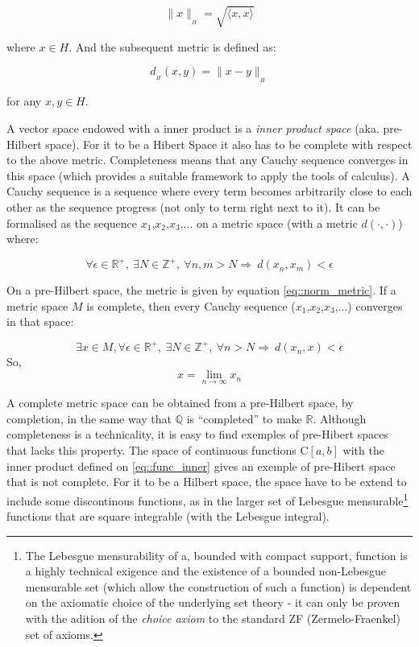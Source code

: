 \begin{equation}
  \| x \|_{_H} = \sqrt{ \langle x,x \rangle }
\end{equation}

where $x \in H$. And the subsequent metric is defined as:

\begin{equation}\label{eq::norm_metric}
  d_{_H}(x,y) = \| x - y \|_{_H}
\end{equation}

for any $x,y \in H$.

A vector space endowed with a inner product is a \textit{inner product space}
(aka. pre-Hilbert space). For it to be a Hibert Space it also has to be complete
with respect to the above metric. Completeness means that any Cauchy sequence
converges in this space (which provides a suitable framework to apply the tools
of calculus). A Cauchy sequence is a sequence where every term becomes
arbitrarily close to each other as the sequence progress (not only to term
right next to it). It can be formalised as the sequence
$x_1$,$x_2$,$x_3$,$\ldots$ on a metric space (with a metric $d( \cdot ,\cdot)$)
where:


\[ \forall \epsilon \in \mathbb{R}^+, ~\exists N \in \mathbb{Z}^+, ~\forall
n,m>N \Longrightarrow ~d(x_n,x_m)<\epsilon
\]

On a pre-Hilbert space, the metric is given by equation \ref{eq::norm_metric}.
If a metric space $M$ is complete, then every Cauchy sequence
($x_1$,$x_2$,$x_3$,$\ldots$) converges in that space:

\[ \exists x \in M, \forall \epsilon \in \mathbb{R}^+, ~\exists N \in \mathbb{Z}^+, ~\forall
n>N \Longrightarrow ~d(x_n,x)<\epsilon
\]
So,
\[ x = \lim_{n\to\infty} x_n \]

A complete metric space can be obtained from a pre-Hilbert space, by completion,
in the same way that $\mathbb{Q}$ is ``completed'' to make $\mathbb{R}$.
Although completeness is a technicality, it is easy to find exemples of
pre-Hibert spaces that lacks this property. The space of continuous functions
C$[a,b]$ with the inner product defined on \ref{eq::func_inner} gives an exemple
of pre-Hibert space that is not complete. For it to be a Hilbert space, the
space have to be extend to include some discontinous functions, as in the larger
set of Lebesgue mensurable\footnote{The Lebesgue mensurability of a, bounded
with compact support, function is a highly technical exigence and the existence
of a bounded non-Lebesgue mensurable set (which allow the construction of such a
function) is dependent on the axiomatic choice of the underlying set theory - it
can only be proven with the adition of the \textit{choice axiom} to the standard
ZF (Zermelo-Fraenkel) set of axioms. } functions that are square integrable
(with the Lebesgue integral).


